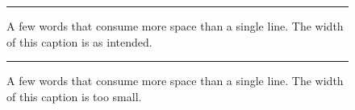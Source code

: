 \documentclass[a4paper,twocolumn,DIV=16]{scrartcl}[2018/03/30]%
\begin{document}
\blindtext
\begin{figure}[htpb]
  \rule{\columnwidth}{2cm}
  \caption{A few words that consume more space than a single line.
    The width of this caption is as intended.
  }
\end{figure}
\blindtext

\clearpage
\begin{figure}[htpb]
  \rule{\textwidth}{2cm}
  \caption{A few words that consume more space than a single line.
    The width of this caption is too small.
  }
\end{figure}
\end{document}
